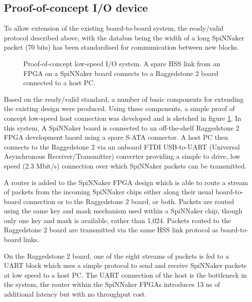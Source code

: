 			\subsection{Proof-of-concept I/O device}
				
				
				To allow extension of the existing board-to-board system, the
				ready/valid protocol described above, with the databus being the width
				of a long SpiNNaker packet (70 bits) has been standardised for
				communication between new blocks.
				
				\begin{figure}
					\center
					
					
					\caption[Proof-of-concept low-speed I/O system.]{Proof-of-concept
					low-speed I/O system. A spare HSS link from an FPGA on a SpiNNaker
					board connects to a Raggedstone 2 board connected to a host PC.}
					\label{fig:proof-of-concept-fpga-links}
				\end{figure}
				
				Based on the ready/valid standard, a number of basic components for
				extending the existing design were produced. Using these components, a
				simple proof of concept low-speed host connection was developed and is
				sketched in figure \ref{fig:proof-of-concept-fpga-links}. In this
				system, A SpiNNaker board is connected to an off-the-shelf Raggedstone 2
				FPGA development baord \cite{raggedstone2} using a spare S-ATA
				connector. A host PC then connects to the Raggedstone 2 via an onboard
				FTDI USB-to-UART (Universal Asynchronous Receiver/Transmitter) converter
				providing a simple to drive, low speed (2.3 Mbit/s) connection over
				which SpiNNaker packets can be transmitted.
				
				A router is added to the SpiNNaker FPGA design which is able to route a
				stream of packets from the incoming SpiNNaker chips either along their
				usual board-to-board connection or to the Raggedstone 2 board, or both.
				Packets are routed using the same key and mask mechanism used within a
				SpiNNaker chip, though only one key and mask is available, rather than
				1,024. Packets routed to the Raggedstone 2 board are transmitted via the
				same HSS link protocol as board-to-board links.
				
				On the Raggedstone 2 board, one of the eight streams of packets is fed
				to a UART block which uses a simple protocol to send and receive
				SpiNNaker packets at low speed to a host PC. The UART connection of the
				host is the bottleneck in the system, the router within the SpiNNaker
				FPGAs introduces 13 ns of additional latency but with no throughput
				cost.
				
